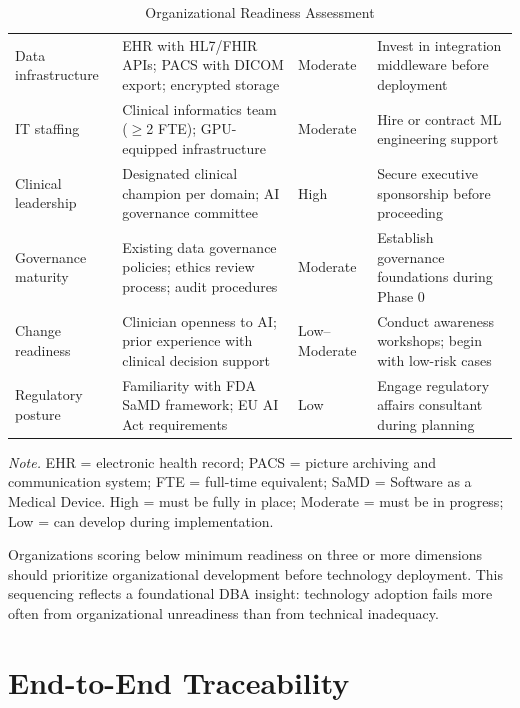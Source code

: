 \begin{table}[H]
\tablestripes
\small
\begin{tabularx}{\textwidth}{L L L L}
\toprule
{} &  &  &  \\
\midrule
Data infrastructure & EHR with HL7/FHIR APIs; PACS with DICOM export; encrypted storage & Moderate & Invest in integration middleware before deployment \\
\addlinespace
IT staffing & Clinical informatics team ($\geq$2 FTE); GPU-equipped infrastructure & Moderate & Hire or contract ML engineering support \\
\addlinespace
Clinical leadership & Designated clinical champion per domain; AI governance committee & High & Secure executive sponsorship before proceeding \\
\addlinespace
Governance maturity & Existing data governance policies; ethics review process; audit procedures & Moderate & Establish governance foundations during Phase 0 \\
\addlinespace
Change readiness & Clinician openness to AI; prior experience with clinical decision support & Low--Moderate & Conduct awareness workshops; begin with low-risk cases \\
\addlinespace
Regulatory posture & Familiarity with FDA SaMD framework; EU AI Act requirements & Low & Engage regulatory affairs consultant during planning \\
\bottomrule
\end{tabularx}
\caption{Organizational Readiness Assessment}
\label{tab:organizational_readiness}
\vspace{0.5em}\noindent\textit{Note.} EHR = electronic health record; PACS = picture archiving and communication system; FTE = full-time equivalent; SaMD = Software as a Medical Device. High = must be fully in place; Moderate = must be in progress; Low = can develop during implementation.
\end{table}

Organizations scoring below minimum readiness on three or more dimensions should prioritize organizational development before technology deployment. This sequencing reflects a foundational DBA insight: technology adoption fails more often from organizational unreadiness than from technical inadequacy.

\section{End-to-End Traceability}
\label{sec:fw_traceability}

